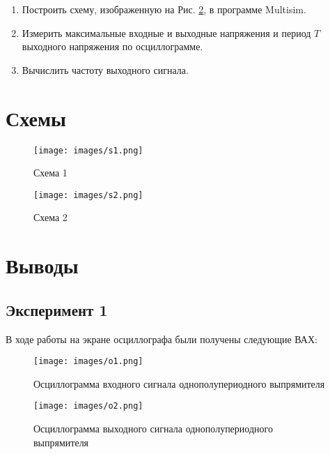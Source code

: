 \documentclass[12pt]{article}
\begin{document}
    \begin{enumerate}
        \item Построить схему, изображенную на Рис. \ref{fig:s:2}, в программе Multisim.
        \item Измерить максимальные входные и выходные напряжения и период $T$ выходного напряжения по осциллограмме.
        \item Вычислить частоту выходного сигнала.
    \end{enumerate}

    \newpage

    \section*{Схемы}

    \begin{figure}[ht]
        \centering
        \texttt{[image: images/s1.png]}
        \caption{Схема 1}
        \label{fig:s:1}
    \end{figure}

    \begin{figure}[ht]
        \centering
        \texttt{[image: images/s2.png]}
        \caption{Схема 2}
        \label{fig:s:2}
    \end{figure}

    \newpage

    \section*{Выводы}

    \subsection*{Эксперимент 1}

    В ходе работы на экране осциллографа были получены следующие ВАХ:

    \begin{figure}[ht]
        \centering
        \texttt{[image: images/o1.png]}
        \caption{ Осциллограмма входного сигнала однополупериодного выпрямителя}
        \label{fig:o:1}
    \end{figure}

    \begin{figure}[ht]
        \centering
        \texttt{[image: images/o2.png]}
        \caption{Осциллограмма выходного сигнала однополупериодного выпрямителя
        }
        \label{fig:o:2}
    \end{figure}
\end{document}
